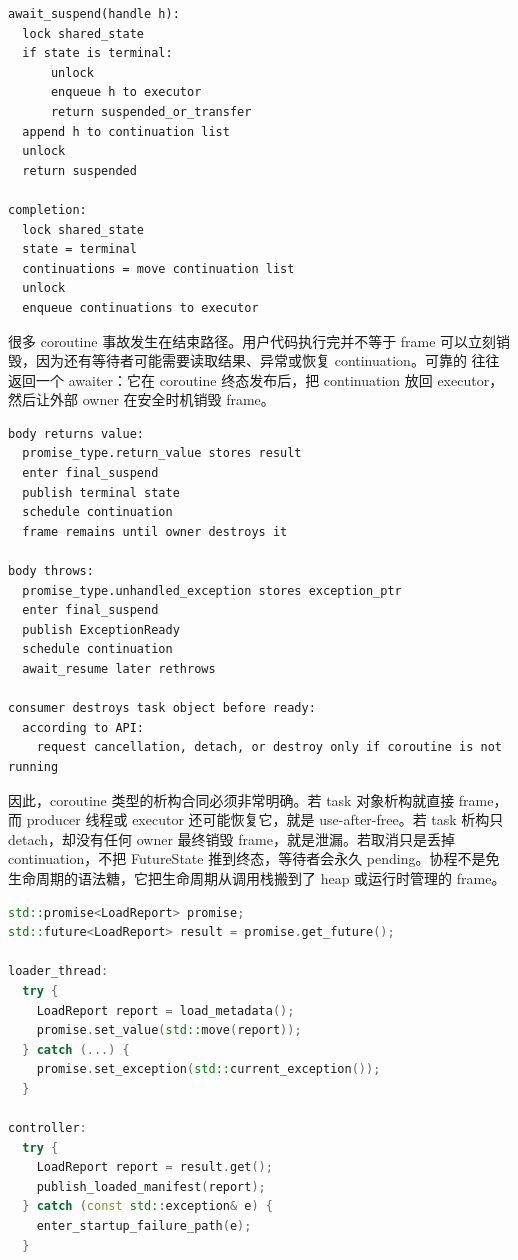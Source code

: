 \begin{lstlisting}[numbers=none,caption={await\_suspend 的竞态处理}]
await_suspend(handle h):
  lock shared_state
  if state is terminal:
      unlock
      enqueue h to executor
      return suspended_or_transfer
  append h to continuation list
  unlock
  return suspended

completion:
  lock shared_state
  state = terminal
  continuations = move continuation list
  unlock
  enqueue continuations to executor
\end{lstlisting}

很多 coroutine 事故发生在结束路径。用户代码执行完并不等于 frame 可以立刻销毁，因为还有等待者可能需要读取结果、异常或恢复 continuation。可靠的  往往返回一个 awaiter：它在 coroutine 终态发布后，把 continuation 放回 executor，然后让外部 owner 在安全时机销毁 frame。

\begin{lstlisting}[numbers=none,caption={coroutine 结束路径的状态账本}]
body returns value:
  promise_type.return_value stores result
  enter final_suspend
  publish terminal state
  schedule continuation
  frame remains until owner destroys it

body throws:
  promise_type.unhandled_exception stores exception_ptr
  enter final_suspend
  publish ExceptionReady
  schedule continuation
  await_resume later rethrows

consumer destroys task object before ready:
  according to API:
    request cancellation, detach, or destroy only if coroutine is not running
\end{lstlisting}

因此，coroutine 类型的析构合同必须非常明确。若 task 对象析构就直接  frame，而 producer 线程或 executor 还可能恢复它，就是 use-after-free。若 task 析构只 detach，却没有任何 owner 最终销毁 frame，就是泄漏。若取消只是丢掉 continuation，不把 FutureState 推到终态，等待者会永久 pending。协程不是免生命周期的语法糖，它把生命周期从调用栈搬到了 heap 或运行时管理的 frame。

\begin{lstlisting}[language=C++,caption={promise 必须在成功和失败路径都满足共享状态}]
std::promise<LoadReport> promise;
std::future<LoadReport> result = promise.get_future();

loader_thread:
  try {
    LoadReport report = load_metadata();
    promise.set_value(std::move(report));
  } catch (...) {
    promise.set_exception(std::current_exception());
  }

controller:
  try {
    LoadReport report = result.get();
    publish_loaded_manifest(report);
  } catch (const std::exception& e) {
    enter_startup_failure_path(e);
  }
\end{lstlisting}

